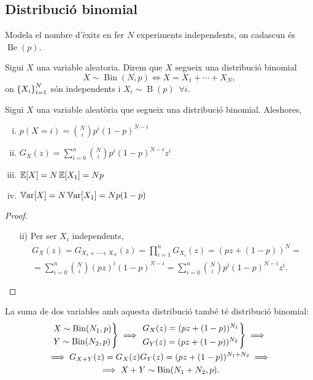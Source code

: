 \subsection*{Distribució binomial}

Modela el nombre d'èxits en fer $N$ experiments independents, on cadascun és $\operatorname{Be}(p)$.

\begin{defi}
  Sigui $X$ una variable aleatoria. Direm que $X$ segueix una distribució binomial
    \[X \sim \operatorname{Bin}(N,p) \iff X = X_1 + \cdots + X_N,\]
    on $\left\{ X_i \right\}_{i=1}^{N}$ són independents i $X_i \sim \operatorname{B}(p) \enspace\forall i$.
\end{defi}

\begin{prop}
    Sigui $X$ una variable aleatòria que segueix una distribució binomial. Aleshores,
    \begin{enumerate}[i)]
        \item $p(X=i) = \binom{N}{i}p^i(1-p)^{N-i}$
        \item $G_X(z) = \sum_{i=0}^{n} \binom{N}{i}p^i(1-p)^{N-i}z^i$
        \item $\operatorname{\mathbb{E}}[X] = N\operatorname{\mathbb{E}}[X_1] = Np$
        \item $\operatorname{\mathbb{V}ar}[X] = N\operatorname{\mathbb{V}ar}[X_1] = Np(1-p)$
    \end{enumerate}
\end{prop}

\begin{proof}
    \begin{enumerate}[i)]
        \item[]
        \item[ii)] Per ser $X_i$ independents,
        \begin{gather*}
        G_X(z) = G_{X_1 + \cdots + X_N}(z) = \prod_{i=1}^{n}G_{X_i}(z) = (pz+(1-p))^N = \\
        = \sum_{i=0}^n \binom{N}{i}(pz)^i(1-p)^{N-i} = \sum_{i=0}^{n} \binom{N}{i}p^i(1-p)^{N-i}z^i.
        \end{gather*}
    \end{enumerate}
\end{proof}

\begin{obs} La suma de dos variables amb aquesta distribució també té distribució binomial:
    \begin{gather*}
    \begin{rcases*} X \sim \operatorname{Bin}(N_1,p) \\ Y \sim \operatorname{Bin}(N_2,p) \end{rcases*} \implies
    \begin{rcases*} G_X(z) = (pz+(1-p))^{N_1} \\ G_Y(z) = (pz+(1-p))^{N_2} \end{rcases*}
    \implies \\
    \implies G_{X+Y}(z) = G_X(z)G_Y(z) = (pz+(1-p))^{N_1+N_2} \implies \\
    \implies X+Y \sim \operatorname{Bin}(N_1+N_2,p).
    \end{gather*}
\end{obs}

